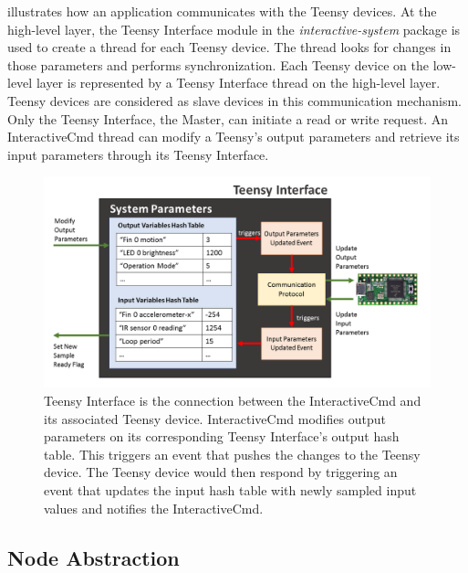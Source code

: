  illustrates how an application communicates with the Teensy devices. At the high-level layer, the Teensy Interface module in the \textit{interactive-system} package is used to create a thread for each Teensy device. The thread looks for changes in those parameters and performs synchronization. Each Teensy device on the low-level layer is represented by a Teensy Interface thread on the high-level layer. Teensy devices are considered as slave devices in this communication mechanism. Only the Teensy Interface, the Master, can initiate a read or write request. An InteractiveCmd thread can modify a Teensy's output parameters and retrieve its input parameters through its Teensy Interface. 

\begin{figure}[!htbp]
	\centering
	\includegraphics[width=0.9 \textwidth]{"fig/interactive control system/TeensyInterface Thread"}
	\caption[Illustration of the working of the Teensy Interface]{Teensy Interface is the connection between the InteractiveCmd and its associated Teensy device. InteractiveCmd modifies output parameters on its corresponding Teensy Interface's output hash table. This triggers an event that pushes the changes to the Teensy device. The Teensy device would then respond by triggering an event that updates the input hash table with newly sampled input values and notifies the InteractiveCmd.}
	\label{fig:TeensyInterface Thread}
\end{figure}

\FloatBarrier
\subsection{Node Abstraction}

